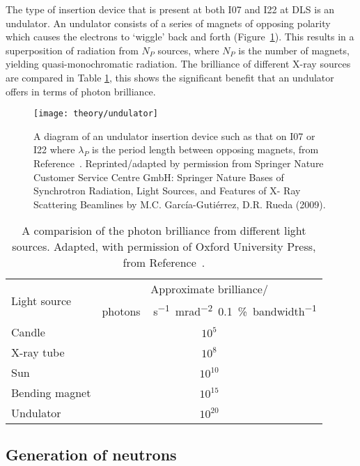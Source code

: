 The type of insertion device that is present at both I07 and I22 at DLS is an undulator.
An undulator consists of a series of magnets of opposing polarity which causes the electrons to `wiggle' back and forth (Figure~\ref{fig:undulator}).
This results in a superposition of radiation from $N_P$ sources, where $N_P$ is the number of magnets, yielding quasi-monochromatic radiation.
The brilliance of different X-ray sources are compared in Table \ref{tab:sources}, this shows the significant benefit that an undulator offers in terms of photon brilliance.
%
\begin{figure}
    \centering
    \texttt{[image: theory/undulator]}
    \caption{A diagram of an undulator insertion device such as that on I07 or I22 where $\lambda_P$ is the period length between opposing magnets, from Reference~\cite{garcia-gutierrez_bases_2009}. Reprinted/adapted by permission from Springer Nature Customer Service Centre GmbH: Springer Nature Bases of Synchrotron Radiation, Light Sources, and Features of X- Ray Scattering Beamlines by M.C. Garc\'{i}a-Guti\'{e}rrez, D.R. Rueda\textsuperscript{\textcopyright} (2009).}
    \label{fig:undulator}
\end{figure}
%
%
\begin{table}
    \centering
    \small
    \caption{A comparision of the photon brilliance from different light sources. Adapted, with permission of Oxford University Press\textsuperscript{\textcopyright}, from Reference~\cite{sivia_elementary_2011}.}
    \label{tab:sources}
    \begin{tabular}{l | c}
        \toprule
        \multirow{2}{*}{Light source } & Approximate brilliance/ \\
 & \si{photons\,\second^{-1}\milli\radian^{-2}{0.1}\percent bandwidth^{-1}} \\
        \midrule
        Candle & $10^5$ \\
        X-ray tube & $10^8$ \\
        Sun & $10^{10}$ \\
        Bending magnet & $10^{15}$ \\
        Undulator & $10^{20}$ \\
        \bottomrule
    \end{tabular}
\end{table}
%

\subsection{Generation of neutrons}
\label{sec:neutrons}

